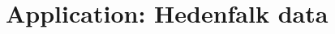 \documentclass[10pt]{article}
\newcommand{\lFDR}{\ell FDR}
\begin{document}




\section{Application: Hedenfalk data} \label{Sec:Applications}
\end{document}
